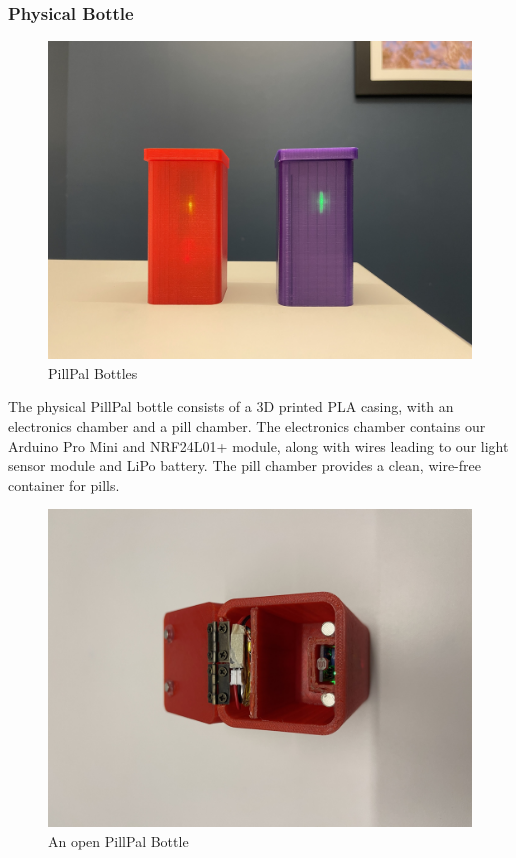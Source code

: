 \documentclass[sigconf]{acmart}
\begin{document}
\subsubsection{Physical Bottle}
\begin{figure}[h]
  \centering
  \includegraphics[width=\linewidth]{images/bottle_front.jpg}
  \caption{PillPal Bottles}
  \label{fig:bottle_front}
\end{figure}

The physical PillPal bottle consists of a 3D printed PLA casing, with an electronics chamber and a pill chamber. The electronics chamber contains our Arduino Pro Mini and NRF24L01+ module, along with wires leading to our light sensor module and LiPo battery. The pill chamber provides a clean, wire-free container for pills.

\begin{figure}[h]
  \centering
  \includegraphics[width=\linewidth]{images/bottle_open.jpg}
  \caption{An open PillPal Bottle}
  \label{fig:bottle_open}
\end{figure}
\end{document}
